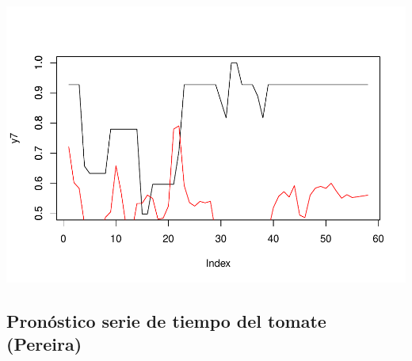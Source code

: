 \documentclass[
]{book}
\begin{document}
\includegraphics{bookdown-demo_files/figure-latex/unnamed-chunk-201-1.pdf}

\hypertarget{pronuxf3stico-serie-de-tiempo-del-tomate-pereira}{%
\subsection{Pronóstico serie de tiempo del tomate (Pereira)}\label{pronuxf3stico-serie-de-tiempo-del-tomate-pereira}}
\end{document}
